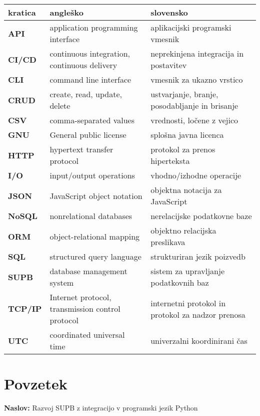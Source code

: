 \documentclass[a4paper,12pt,openright]{book}
\newcommand{\ttitle}{Razvoj SUPB z integracijo v programski jezik Python}
\newcommand{\clearemptydoublepage}{\newpage{\pagestyle{empty}\cleardoublepage}}
\begin{document}
\noindent\begin{tabular}{p{}|p{}|p{}}
  {\bf kratica} & {\bf angleško}                              & {\bf slovensko} \\ \hline
  {\bf API} & application programming interface & aplikacijski programski vmesnik \\
  {\bf CI/CD} & continuous integration, continuous delivery & neprekinjena integracija in postavitev \\
  {\bf CLI} & command line interface & vmesnik za ukazno vrstico \\
  {\bf CRUD} & create, read, update, delete & ustvarjanje, branje, posodabljanje in brisanje \\
  {\bf CSV} & comma-separated values & vrednosti, ločene z vejico \\
  {\bf GNU} & General public license & splošna javna licenca \\
  {\bf HTTP} & hypertext transfer protocol & protokol za prenos hiperteksta \\
  {\bf I/O} & input/output operations & vhodno/izhodne operacije \\
  {\bf JSON} & JavaScript object notation & objektna notacija za JavaScript \\
  {\bf NoSQL} & nonrelational databases & nerelacijske podatkovne baze \\
  {\bf ORM} & object-relational mapping & objektno relacijska preslikava \\
  {\bf SQL} & structured query language & strukturiran jezik poizvedb \\
  {\bf SUPB} & database management system & sistem za upravljanje podatkovnih baz \\
  {\bf TCP/IP} & Internet protocol, transmission control protocol & internetni protokol in protokol za nadzor prenosa \\
  {\bf UTC} & coordinated universal time & univerzalni koordinirani čas \\
\end{tabular}


\clearemptydoublepage

{}
\chapter*{Povzetek}

\noindent\textbf{Naslov:} \ttitle
\bigskip
\end{document}
